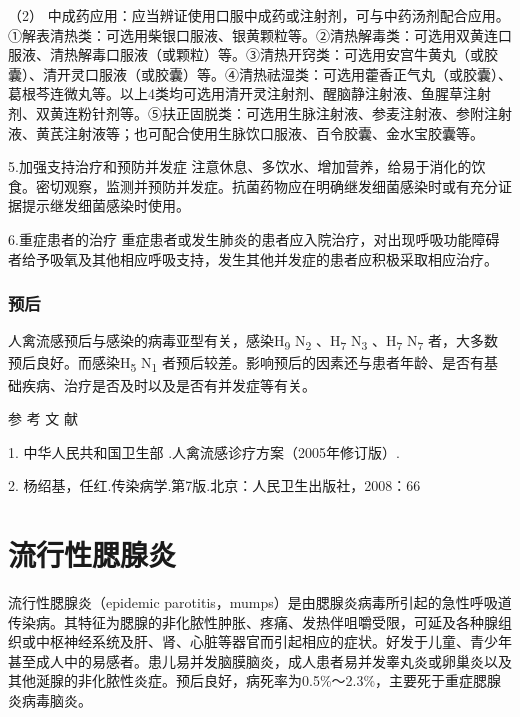 （2）
中成药应用：应当辨证使用口服中成药或注射剂，可与中药汤剂配合应用。①解表清热类：可选用柴银口服液、银黄颗粒等。②清热解毒类：可选用双黄连口服液、清热解毒口服液（或颗粒）等。③清热开窍类：可选用安宫牛黄丸（或胶囊）、清开灵口服液（或胶囊）等。④清热祛湿类：可选用藿香正气丸（或胶囊）、葛根芩连微丸等。以上4类均可选用清开灵注射剂、醒脑静注射液、鱼腥草注射剂、双黄连粉针剂等。⑤扶正固脱类：可选用生脉注射液、参麦注射液、参附注射液、黄芪注射液等；也可配合使用生脉饮口服液、百令胶囊、金水宝胶囊等。

5.加强支持治疗和预防并发症
注意休息、多饮水、增加营养，给易于消化的饮食。密切观察，监测并预防并发症。抗菌药物应在明确继发细菌感染时或有充分证据提示继发细菌感染时使用。

6.重症患者的治疗
重症患者或发生肺炎的患者应入院治疗，对出现呼吸功能障碍者给予吸氧及其他相应呼吸支持，发生其他并发症的患者应积极采取相应治疗。

\subsection{预后}

人禽流感预后与感染的病毒亚型有关，感染H\textsubscript{9}
N\textsubscript{2} 、H\textsubscript{7} N\textsubscript{3}
、H\textsubscript{7} N\textsubscript{7}
者，大多数预后良好。而感染H\textsubscript{5} N\textsubscript{1}
者预后较差。影响预后的因素还与患者年龄、是否有基础疾病、治疗是否及时以及是否有并发症等有关。

\protect\hypertarget{text00214.html}{}{}

\hypertarget{text00214.htmlux5cux23CHP7-2-5}{}
参 考 文 献

1. 中华人民共和国卫生部 .人禽流感诊疗方案（2005年修订版）.

2. 杨绍基，任红.传染病学.第7版.北京：人民卫生出版社，2008：66

\protect\hypertarget{text00215.html}{}{}

\chapter{流行性腮腺炎}

流行性腮腺炎（epidemic
parotitis，mumps）是由腮腺炎病毒所引起的急性呼吸道传染病。其特征为腮腺的非化脓性肿胀、疼痛、发热伴咀嚼受限，可延及各种腺组织或中枢神经系统及肝、肾、心脏等器官而引起相应的症状。好发于儿童、青少年甚至成人中的易感者。患儿易并发脑膜脑炎，成人患者易并发睾丸炎或卵巢炎以及其他涎腺的非化脓性炎症。预后良好，病死率为0.5\%～2.3\%，主要死于重症腮腺炎病毒脑炎。

